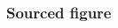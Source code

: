 \begin{frame}
    \frametitle{Sourced figure}


    \begin{columns}
        \begin{column}{0.7\textwidth}

            \lipsum[1]

        \end{column}
        \begin{column}{0.3\textwidth}


        \end{column}
    \end{columns}


\end{frame}

